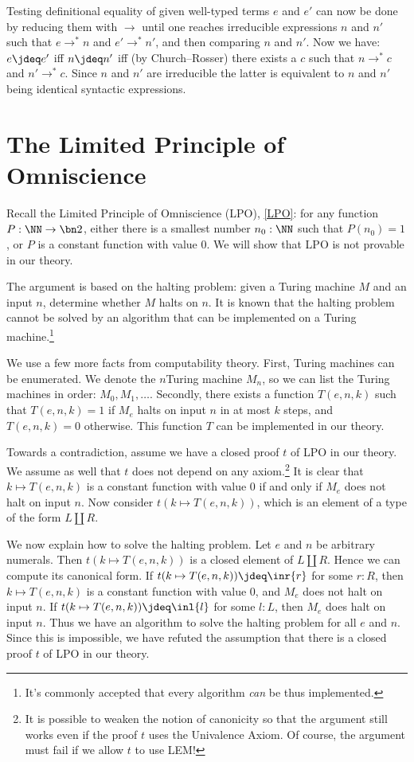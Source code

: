 Testing definitional equality of given well-typed terms $e$ and $e'$ can now be done
by reducing them with $\to$ until one reaches irreducible expressions $n$ and $n'$
such that $e\to^* n$ and $e'\to^* n'$, and then comparing $n$ and $n'$. 
Now we have: $e\jdeq e'$ iff $n\jdeq n'$ iff (by Church--Rosser)
there exists a $c$ such that $n\to^* c$ and $n'\to^* c$.
Since $n$ and $n'$ are irreducible the latter is equivalent to
$n$ and $n'$ being identical syntactic expressions.

\section{The Limited Principle of Omniscience}
\label{sec:LPO}

\begin{remark}\label{rem:LPO-solves-halting problem}
Recall the Limited Principle of Omniscience (LPO), \cref{LPO}:
  for any function $P:\NN\to\bn 2$,
  either there is a smallest number $n_0:\NN$ such that $P(n_0)=1$,
  or $P$ is a constant function with value $0$.
We will show that LPO is not provable in our theory.

The argument is based on the halting problem: given a Turing machine
$M$ and an input $n$, determine whether $M$ halts on $n$.
It is known that the halting problem cannot be solved by an algorithm
that can be implemented on a Turing machine.\footnote{It's commonly accepted that
  every algorithm \emph{can} be thus implemented.}

We use a few more facts from computability theory.
First, Turing machines can be enumerated. We denote the $n$\th Turing machine $M_n$,
so we can list the Turing machines in order: $M_0,M_1,\ldots$.
Secondly, there exists a function $T(e,n,k)$ such that $T(e,n,k) = 1$
if $M_e$ halts on input $n$ in at most $k$ steps, and $T(e,n,k) = 0$
otherwise. This function $T$ can be implemented in our theory.

Towards a contradiction, assume we have a closed proof $t$ of LPO in our theory.
We assume as well that $t$ does not depend on any axiom.\footnote{It is possible to weaken the notion
  of canonicity so that the argument still works even if the proof $t$ uses the Univalence Axiom.
Of course, the argument must fail if we allow $t$ to use LEM!}
It is clear that $k\mapsto T(e,n,k)$ is a constant function with value $0$
if and only if $M_e$ does not halt on input $n$. Now consider $t(k\mapsto T(e,n,k))$,
which is an element of a type of the form $L\coprod R$.

We now explain how to solve the halting problem.
Let $e$ and $n$ be arbitrary numerals.
Then $t(k\mapsto T(e,n,k))$ is a closed element of $L\coprod R$.
Hence we can compute its canonical form. If $t(k\mapsto T(e,n,k))\jdeq\inr{r}$ for some
$r:R$, then $k\mapsto T(e,n,k)$ is a constant function with value $0$,
and $M_e$ does not halt on input $n$. If $t(k\mapsto T(e,n,k))\jdeq\inl{l}$ for some
$l:L$, then $M_e$ does halt on input $n$.
Thus we have an algorithm to solve the halting problem
for all $e$ and $n$. Since this is impossible, we have refuted the assumption
that there is a closed proof $t$ of LPO in our theory.
\end{remark}

